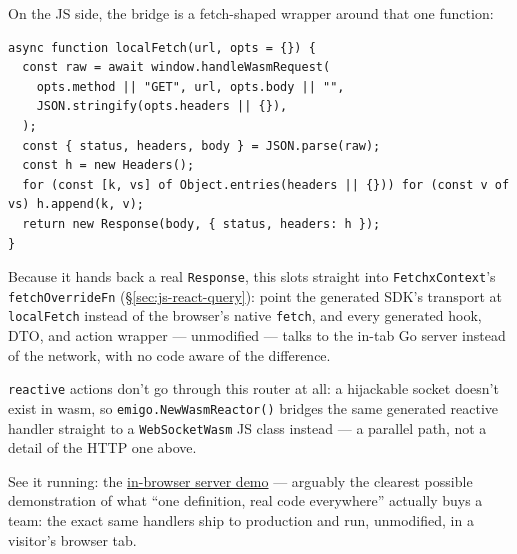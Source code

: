 On the JS side, the bridge is a fetch-shaped wrapper around that one
function:
\begin{lstlisting}
async function localFetch(url, opts = {}) {
  const raw = await window.handleWasmRequest(
    opts.method || "GET", url, opts.body || "",
    JSON.stringify(opts.headers || {}),
  );
  const { status, headers, body } = JSON.parse(raw);
  const h = new Headers();
  for (const [k, vs] of Object.entries(headers || {})) for (const v of vs) h.append(k, v);
  return new Response(body, { status, headers: h });
}
\end{lstlisting}
Because it hands back a real \texttt{Response}, this slots straight into
\texttt{FetchxContext}'s \texttt{fetchOverrideFn} (\S\ref{sec:js-react-query}):
point the generated SDK's transport at \texttt{localFetch} instead of the
browser's native \texttt{fetch}, and every generated hook, DTO, and
action wrapper --- unmodified --- talks to the in-tab Go server instead
of the network, with no code aware of the difference.

\texttt{reactive} actions don't go through this router at all: a
hijackable socket doesn't exist in wasm, so \texttt{emigo.NewWasmReactor()}
bridges the same generated reactive handler straight to a
\texttt{WebSocketWasm} JS class instead --- a parallel path, not a
detail of the HTTP one above.

\begin{pullquote}
See it running: the
\href{https://torabian.github.io/emi/in-browser-server/}{in-browser
server demo} --- arguably the clearest possible demonstration of what
``one definition, real code everywhere'' actually buys a team: the exact
same handlers ship to production and run, unmodified, in a visitor's
browser tab.
\end{pullquote}
